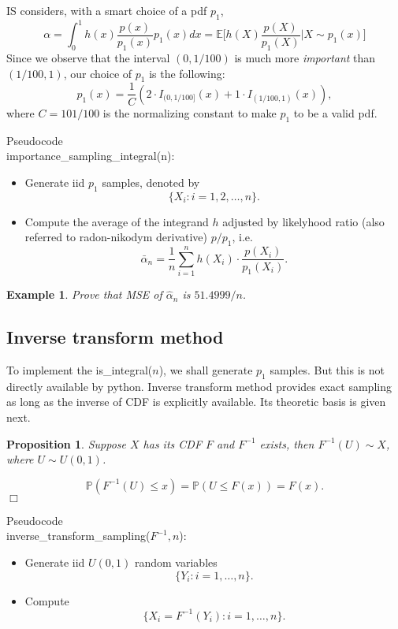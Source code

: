 \documentclass{article}
\newtheorem{proposition}[theorem]{Proposition}
\newtheorem{example}{Example}
\newenvironment{proof}{\noindent {\sc Proof:}}{$\Box$} %
\begin{document}
IS considers, with a smart choice of a pdf $p_{1}$, 
$$\alpha = \int_{0}^{1} h(x)\frac{p(x)}{p_{1}(x)} p_{1} (x) dx= 
\mathbb E \Big[h(X) \frac{p(X)}{p_{1}(X)} \Big| X\sim p_{1}(x) \Big] $$
Since we observe that the interval $(0, 1/100)$ is much more {\it important}
than $(1/100, 1)$, our choice of $p_{1}$ is the following:
$$p_{1} (x) = \frac{1}{C} (2 \cdot I_{(0, 1/100]} (x) + 1 \cdot I_{(1/100, 1)}(x)),$$
where
$C = 101/100$ is the normalizing constant to make $p_{1}$ to be a valid pdf.

Pseudocode 
\\importance\_sampling\_integral(n): 
\begin{itemize}
 \item Generate iid $p_{1}$ samples, denoted by
 $$\{X_{i}: i = 1, 2, \ldots, n\}.$$
 \item Compute the average of the integrand $h$ adjusted by 
 likelyhood ratio (also referred to radon-nikodym derivative) $p/p_{1}$, i.e.
 $$\bar \alpha_{n} = \frac 1 n \sum_{i=1}^{n} h(X_{i}) \cdot 
 \frac{p(X_{i})}{p_{1}(X_{i})}.$$
\end{itemize}

\begin{example}
 Prove that MSE of $\hat \alpha_{n}$ is $51.4999/n$.
\end{example}

\subsection{Inverse transform method}
To implement the is\_integral($n$), we  shall generate $p_{1}$ samples.
But this is not directly available by python. 
Inverse transform method provides exact sampling as long as the inverse of CDF is explicitly available. Its theoretic basis is given next.

\begin{proposition}
 Suppose $X$ has its CDF $F$ and $F^{-1}$ exists, then 
 $F^{-1}(U) \sim X$, where $U\sim U(0,1)$.
\end{proposition}
\begin{proof}
 $$\mathbb P(F^{-1}(U) \le x) = \mathbb P(U\le F(x)) = F(x).$$
\end{proof}

Pseudocode 
\\inverse\_transform\_sampling($F^{-1}, n$):
\begin{itemize}
 \item Generate iid $U(0,1)$ random variables
 $$\{Y_{i}: i = 1, \ldots, n\}.$$
 \item Compute
 $$\{X_{i} = F^{-1}(Y_{i}): i = 1, \ldots, n\}.$$
\end{itemize}
\end{document}
